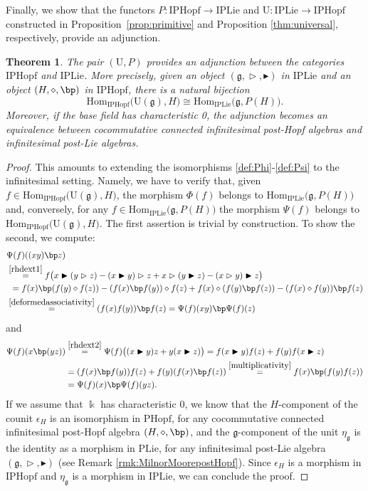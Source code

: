 \documentclass[10pt]{article}
\newtheorem {theorem} [lemma] {Theorem}
\theoremstyle{definition}
\newcommand{\g}{\mathfrak{g}}
\newcommand{\wt}{\vartriangleright}
\newcommand{\bt}{\blacktriangleright}
\renewcommand{\wp}{\diamond}
\begin{document}
Finally, we show that the functors $P:\mathrm{IPHopf}\to\mathrm{IPLie}$ and $\mathrm{U}:\mathrm{IPLie}\to\mathrm{IPHopf}$ constructed in Proposition~\ref{prop:primitive} and Proposition \ref{thm:universal}, respectively, provide an adjunction.

\begin{theorem}\label{thm:main}
The pair $(\mathrm{U},P)$ provides an adjunction between the categories $\mathrm{IPHopf}$ and $\mathrm{IPLie}$. More precisely, given an object $(\mathfrak{g},\wt,\bt)$ in $\mathrm{IPLie}$ and an object $(H,\wp,\bp)$ in $\mathrm{IPHopf}$, there is a natural bijection 
\[
\mathrm{Hom}_{\mathrm{IPHopf}}\big(\mathrm{U}(\mathfrak{g}),H\big)\cong\mathrm{Hom}_{\mathrm{IPLie}}\big(\mathfrak{g},P(H)\big).
\]
Moreover, if the base field has characteristic 0, the adjunction becomes an equivalence between cocommutative connected infinitesimal post-Hopf algebras and infinitesimal post-Lie algebras.
\end{theorem}

\begin{proof}
This amounts to extending the isomorphisms \eqref{def:Phi}-\eqref{def:Psi} to the infinitesimal setting.
Namely, we have to verify that, given $f \in \mathrm{Hom}_{\mathrm{IPHopf}}\big(\mathrm{U}(\mathfrak{g}),H\big)$, 
the morphism $\Phi(f)$ 
belongs to $\mathrm{Hom}_{\mathrm{IPLie}}\big(\mathfrak{g},P(H)\big)$ and, conversely, for any $f \in \mathrm{Hom}_{\mathrm{IPLie}}\big(\mathfrak{g},P(H)\big)$ 
the morphism $\Psi(f)$ belongs to $\mathrm{Hom}_{\mathrm{IPHopf}}\big(\mathrm{U}(\mathfrak{g}),H\big)$. The first assertion is trivial by construction. To show the second, we compute:
\begin{align*}
&\Psi(f)((xy)\bp z)
    \\&\overset{\eqref{rhdext1}}{=}f\big(x\bt(y\wt z)-(x\bt y)\wt z
    +x\wt(y\bt z)-(x\wt y)\bt z\big)\\&\hspace{0.15cm}=f(x)\bp(f(y)\wp f(z))-(f(x)\bp f(y))\wp f(z)
    +f(x)\wp(f(y)\bp f(z))-(f(x)\wp f(y))\bp f(z)\\&\overset{\eqref{deformedassociativity}}{=}(f(x)f(y))\bp f(z)=\Psi(f)(xy)\bp\Psi(f)(z)
\end{align*}
and
\begin{align*}
    \Psi(f)(x \bp(yz))
    &\overset{\eqref{rhdext2}}{=}\Psi(f)\big((x\bt y)z+y(x\bt z)\big)=f(x\bt y)f(z)+f(y)f(x\bt z)\\&=(f(x)\bp f(y))f(z)+f(y)(f(x)\bp f(z))\overset{\eqref{multiplicativity}}{=}f(x)\bp(f(y)f(z))\\&=\Psi(f)(x)\bp\Psi(f)(yz).
\end{align*}
If we assume that $\Bbbk$ has characteristic 0, we know that the $H$-component of the counit $\epsilon_{H}$ is an isomorphism in $\mathrm{PHopf}$, for any cocommutative connected infinitesimal post-Hopf algebra $(H,\wp,\bp)$, and the $\g$-component of the unit $\eta_{\g}$ is the identity as a morphism in $\mathrm{PLie}$, for any infinitesimal post-Lie algebra $(\g,\wt,\bt)$ (see Remark \ref{rmk:MilnorMoorepostHopf}). Since $\epsilon_{H}$ is a morphism in $\mathrm{IPHopf}$ and $\eta_{\g}$ is a morphism in $\mathrm{IPLie}$, we can conclude the proof.
\end{proof}
\end{document}
